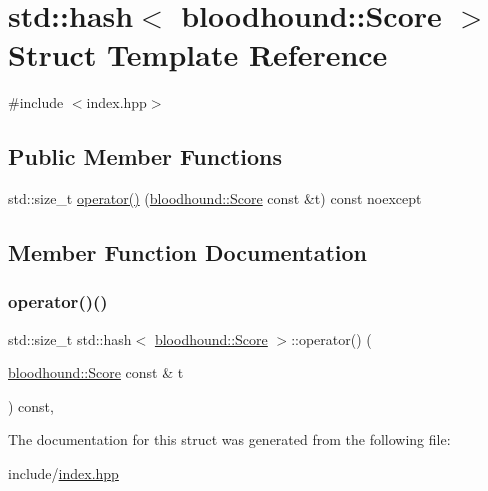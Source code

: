 \hypertarget{structstd_1_1hash_3_01bloodhound_1_1Score_01_4}{}\section{std\+:\+:hash$<$ bloodhound\+:\+:Score $>$ Struct Template Reference}
\label{structstd_1_1hash_3_01bloodhound_1_1Score_01_4}


{\ttfamily \#include $<$index.\+hpp$>$}

\subsection*{Public Member Functions}
\begin{DoxyCompactItemize}
\item 
std\+::size\+\_\+t \mbox{\hyperlink{structstd_1_1hash_3_01bloodhound_1_1Score_01_4_a8e9e8081ca942b25eafe41f8f76a584b}{operator()}} (\mbox{\hyperlink{structbloodhound_1_1Score}{bloodhound\+::\+Score}} const \&t) const noexcept
\end{DoxyCompactItemize}


\subsection{Member Function Documentation}
\mbox{\label{structstd_1_1hash_3_01bloodhound_1_1Score_01_4_a8e9e8081ca942b25eafe41f8f76a584b}} 
\subsubsection{\texorpdfstring{operator()()}{operator()()}}
{\footnotesize\ttfamily std\+::size\+\_\+t std\+::hash$<$ \mbox{\hyperlink{structbloodhound_1_1Score}{bloodhound\+::\+Score}} $>$\+::operator() (\begin{DoxyParamCaption}\item[{\mbox{\hyperlink{structbloodhound_1_1Score}{bloodhound\+::\+Score}} const \&}]{t }\end{DoxyParamCaption}) const\hspace{0.3cm}{\ttfamily [inline]}, {\ttfamily [noexcept]}}



The documentation for this struct was generated from the following file\+:\begin{DoxyCompactItemize}
\item 
include/\mbox{\hyperlink{index_8hpp}{index.\+hpp}}\end{DoxyCompactItemize}
